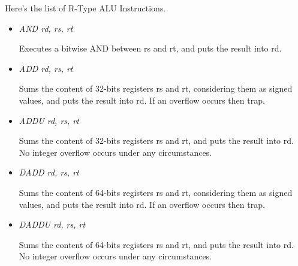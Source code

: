 \documentclass[letterpaper,10pt,english]{sphinxmanual}
\begin{document}
Here's the list of R-Type ALU Instructions.
\begin{itemize}
\item {} 
\emph{AND rd, rs, rt}

Executes a bitwise AND between rs and rt, and puts the result into rd.

\item {} 
\emph{ADD rd, rs, rt}

Sums the content of 32-bits registers rs and rt, considering them as signed values, and puts
the result into rd. If an overflow occurs then trap.

\item {} 
\emph{ADDU rd, rs, rt}

Sums the content of 32-bits registers rs and rt, and puts the result into rd.
No integer overflow occurs under any circumstances.

\end{itemize}
\begin{itemize}
\item {} 
\emph{DADD rd, rs, rt}

Sums the content of 64-bits registers rs and rt, considering them as signed values, and puts
the result into rd. If an overflow occurs then trap.

\item {} 
\emph{DADDU rd, rs, rt}

Sums the content of 64-bits registers rs and rt, and puts the result into rd.
No integer overflow occurs under any circumstances.

\end{itemize}
\end{document}
